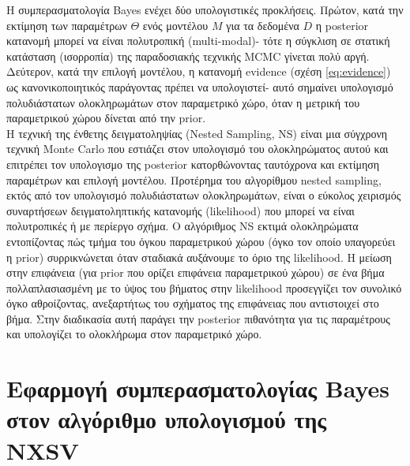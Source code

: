 Η συμπερασματολογία \textlatin{Bayes} ενέχει δύο υπολογιστικές προκλήσεις. Πρώτον, κατά την εκτίμηση των παραμέτρων $\Theta$ ενός μοντέλου $Μ$ για τα δεδομένα $D$ η \textlatin{posterior} κατανομή μπορεί να είναι πολυτροπική \textlatin{(multi-modal)}- τότε η σύγκλιση σε στατική κατάσταση (ισορροπία) της παραδοσιακής τεχνικής \textlatin{MCMC} γίνεται πολύ αργή. Δεύτερον, κατά την επιλογή μοντέλου, η κατανομή \textlatin{evidence} (σχέση \ref{eq:evidence}) ως κανονικοποιητικός παράγοντας πρέπει να υπολογιστεί- αυτό σημαίνει υπολογισμό πολυδιάστατων ολοκληρωμάτων στον παραμετρικό χώρο, όταν η μετρική του παραμετρικού χώρου δίνεται από την \textlatin{prior}.\\
Η τεχνική της ένθετης δειγματοληψίας \textlatin{(Nested Sampling, NS)} είναι μια σύγχρονη τεχνική \textlatin{Monte Carlo} που εστιάζει στον υπολογισμό του ολοκληρώματος αυτού και επιτρέπει τον υπολογισμο της \textlatin{posterior} κατορθώνοντας ταυτόχρονα και εκτίμηση παραμέτρων και επιλογή μοντέλου\cite{Feroz2019}.
Προτέρημα του αλγορίθμου \textlatin{nested sampling}, εκτός από τον υπολογισμό πολυδιάστατων ολοκληρωμάτων, είναι ο εύκολος χειρισμός συναρτήσεων δειγματοληπτικής κατανομής (\textlatin{likelihood}) που μπορεί να είναι πολυτροπικές ή με περίεργο σχήμα. Ο αλγόριθμος \textlatin{NS} εκτιμά ολοκληρώματα εντοπίζοντας πώς τμήμα του όγκου παραμετρικού χώρου (όγκο τον οποίο υπαγορεύει η \textlatin{prior}) συρρικνώνεται όταν σταδιακά αυξάνουμε το όριο της \textlatin{likelihood}. Η μείωση στην επιφάνεια (για \textlatin{prior} που ορίζει επιφάνεια παραμετρικού χώρου) σε ένα βήμα πολλαπλασιασμένη με το ύψος του βήματος στην \textlatin{likelihood} προσεγγίζει τον συνολικό όγκο αθροίζοντας, ανεξαρτήτως του σχήματος της επιφάνειας που αντιστοιχεί στο βήμα. Στην διαδικασία αυτή παράγει την \textlatin{posterior} πιθανότητα για τις παραμέτρους και υπολογίζει το ολοκλήρωμα στον παραμετρικό χώρο\cite{Buchner2014}. 


\section{Εφαρμογή συμπερασματολογίας \textlatin{Bayes} στον αλγόριθμο υπολογισμού της \textlatin{NXSV}}

